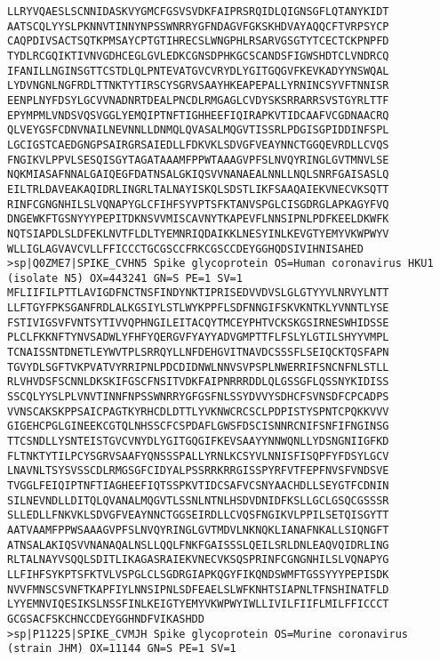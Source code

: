 \begin{lstlisting}
LLRYVQAESLSCNNIDASKVYGMCFGSVSVDKFAIPRSRQIDLQIGNSGFLQTANYKIDT
AATSCQLYYSLPKNNVTINNYNPSSWNRRYGFNDAGVFGKSKHDVAYAQQCFTVRPSYCP
CAQPDIVSACTSQTKPMSAYCPTGTIHRECSLWNGPHLRSARVGSGTYTCECTCKPNPFD
TYDLRCGQIKTIVNVGDHCEGLGVLEDKCGNSDPHKGCSCANDSFIGWSHDTCLVNDRCQ
IFANILLNGINSGTTCSTDLQLPNTEVATGVCVRYDLYGITGQGVFKEVKADYYNSWQAL
LYDVNGNLNGFRDLTTNKTYTIRSCYSGRVSAAYHKEAPEPALLYRNINCSYVFTNNISR
EENPLNYFDSYLGCVVNADNRTDEALPNCDLRMGAGLCVDYSKSRRARRSVSTGYRLTTF
EPYMPMLVNDSVQSVGGLYEMQIPTNFTIGHHEEFIQIRAPKVTIDCAAFVCGDNAACRQ
QLVEYGSFCDNVNAILNEVNNLLDNMQLQVASALMQGVTISSRLPDGISGPIDDINFSPL
LGCIGSTCAEDGNGPSAIRGRSAIEDLLFDKVKLSDVGFVEAYNNCTGGQEVRDLLCVQS
FNGIKVLPPVLSESQISGYTAGATAAAMFPPWTAAAGVPFSLNVQYRINGLGVTMNVLSE
NQKMIASAFNNALGAIQEGFDATNSALGKIQSVVNANAEALNNLLNQLSNRFGAISASLQ
EILTRLDAVEAKAQIDRLINGRLTALNAYISKQLSDSTLIKFSAAQAIEKVNECVKSQTT
RINFCGNGNHILSLVQNAPYGLCFIHFSYVPTSFKTANVSPGLCISGDRGLAPKAGYFVQ
DNGEWKFTGSNYYYPEPITDKNSVVMISCAVNYTKAPEVFLNNSIPNLPDFKEELDKWFK
NQTSIAPDLSLDFEKLNVTFLDLTYEMNRIQDAIKKLNESYINLKEVGTYEMYVKWPWYV
WLLIGLAGVAVCVLLFFICCCTGCGSCCFRKCGSCCDEYGGHQDSIVIHNISAHED
>sp|Q0ZME7|SPIKE_CVHN5 Spike glycoprotein OS=Human coronavirus HKU1 (isolate N5) OX=443241 GN=S PE=1 SV=1
MFLIIFILPTTLAVIGDFNCTNSFINDYNKTIPRISEDVVDVSLGLGTYYVLNRVYLNTT
LLFTGYFPKSGANFRDLALKGSIYLSTLWYKPPFLSDFNNGIFSKVKNTKLYVNNTLYSE
FSTIVIGSVFVNTSYTIVVQPHNGILEITACQYTMCEYPHTVCKSKGSIRNESWHIDSSE
PLCLFKKNFTYNVSADWLYFHFYQERGVFYAYYADVGMPTTFLFSLYLGTILSHYYVMPL
TCNAISSNTDNETLEYWVTPLSRRQYLLNFDEHGVITNAVDCSSSFLSEIQCKTQSFAPN
TGVYDLSGFTVKPVATVYRRIPNLPDCDIDNWLNNVSVPSPLNWERRIFSNCNFNLSTLL
RLVHVDSFSCNNLDKSKIFGSCFNSITVDKFAIPNRRRDDLQLGSSGFLQSSNYKIDISS
SSCQLYYSLPLVNVTINNFNPSSWNRRYGFGSFNLSSYDVVYSDHCFSVNSDFCPCADPS
VVNSCAKSKPPSAICPAGTKYRHCDLDTTLYVKNWCRCSCLPDPISTYSPNTCPQKKVVV
GIGEHCPGLGINEEKCGTQLNHSSCFCSPDAFLGWSFDSCISNNRCNIFSNFIFNGINSG
TTCSNDLLYSNTEISTGVCVNYDLYGITGQGIFKEVSAAYYNNWQNLLYDSNGNIIGFKD
FLTNKTYTILPCYSGRVSAAFYQNSSSPALLYRNLKCSYVLNNISFISQPFYFDSYLGCV
LNAVNLTSYSVSSCDLRMGSGFCIDYALPSSRRKRRGISSPYRFVTFEPFNVSFVNDSVE
TVGGLFEIQIPTNFTIAGHEEFIQTSSPKVTIDCSAFVCSNYAACHDLLSEYGTFCDNIN
SILNEVNDLLDITQLQVANALMQGVTLSSNLNTNLHSDVDNIDFKSLLGCLGSQCGSSSR
SLLEDLLFNKVKLSDVGFVEAYNNCTGGSEIRDLLCVQSFNGIKVLPPILSETQISGYTT
AATVAAMFPPWSAAAGVPFSLNVQYRINGLGVTMDVLNKNQKLIANAFNKALLSIQNGFT
ATNSALAKIQSVVNANAQALNSLLQQLFNKFGAISSSLQEILSRLDNLEAQVQIDRLING
RLTALNAYVSQQLSDITLIKAGASRAIEKVNECVKSQSPRINFCGNGNHILSLVQNAPYG
LLFIHFSYKPTSFKTVLVSPGLCLSGDRGIAPKQGYFIKQNDSWMFTGSSYYYPEPISDK
NVVFMNSCSVNFTKAPFIYLNNSIPNLSDFEAELSLWFKNHTSIAPNLTFNSHINATFLD
LYYEMNVIQESIKSLNSSFINLKEIGTYEMYVKWPWYIWLLIVILFIIFLMILFFICCCT
GCGSACFSKCHNCCDEYGGHNDFVIKASHDD
>sp|P11225|SPIKE_CVMJH Spike glycoprotein OS=Murine coronavirus (strain JHM) OX=11144 GN=S PE=1 SV=1

\end{lstlisting}
